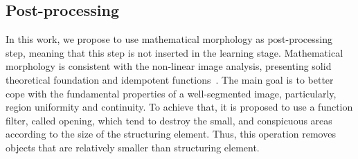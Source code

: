
%

\subsection{Post-processing}
\label{ssec:post_processing}



In this work, we propose to use mathematical morphology as post-processing step, meaning that this step is not inserted in the learning stage. Mathematical morphology is consistent with the non-linear image analysis, presenting solid theoretical foundation and idempotent functions~\cite{najman13}. The main goal is to better cope with the fundamental properties of a well-segmented image, particularly, region uniformity and continuity. To achieve that, it is proposed to use a function filter, called opening, which tend to destroy the small, and conspicuous areas according to the size of the structuring element. Thus, this operation removes objects that are relatively smaller than structuring element.

